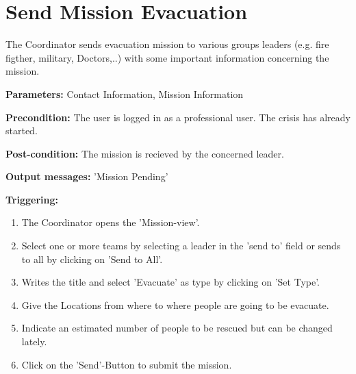 \section{Send Mission Evacuation}
\label{operation:Evacuate}
The Coordinator sends evacuation mission to various groups leaders (e.g. fire
figther, military, Doctors,..) with some important information concerning the
mission.\\
\begin{description}
\item \textbf{Parameters:} Contact Information, Mission Information
\item \textbf{Precondition:} The user is logged in as a professional user. The
crisis has already started.  
\item \textbf{Post-condition:} The mission is recieved by the concerned leader.
\item \textbf{Output messages:} 'Mission Pending'
\item \textbf{Triggering:}
\begin{enumerate}
\item The Coordinator opens the 'Mission-view'.
\item Select one or more teams by selecting a leader in the 'send to' field or
sends to all by clicking on 'Send to All'.
\item Writes the title and select 'Evacuate' as type by clicking on 'Set
Type'.
\item Give the Locations from where to where people are going to be evacuate.
\item Indicate an estimated number of people to be rescued but can be changed
lately.
\item Click on the 'Send'-Button to submit the mission.
\end{enumerate}
\end{description}

